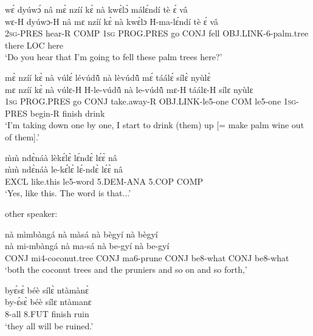\begin{exe} 
\exC\label{77}
  \glll  wɛ́ dyúwɔ́ nâ mɛ̀ nzíí kɛ̀ nà kwɛ̀lɔ̀ málɛ́ndí tè ɛ́ vâ \\
         wɛ-H dyúwɔ-H nâ mɛ nzíí kɛ̀ nà kwɛ̀lɔ H-ma-lɛ́ndí tè ɛ́ vâ \\
           2\textsc{sg}-PRES hear-R COMP 1\textsc{sg} PROG.PRES go CONJ fell OBJ.LINK-6-palm.tree there LOC here \\
    \trans `Do you hear that I'm going to fell these palm trees here?'
\end{exe}

\begin{exe} 
\exC\label{78}
  \glll   mɛ̀ nzíí kɛ̀ nà vúlɛ́ lévúdũ̂ nà lèvúdũ̂ mɛ́ táálɛ́ sílɛ̀ nyùlɛ̀ \\
          mɛ nzíí kɛ̀ nà vúlɛ-H H-le-vúdũ̂ nà le-vúdũ̂ mɛ-H táálɛ-H sílɛ nyùlɛ \\
           1\textsc{sg} PROG.PRES go CONJ take.away-R OBJ.LINK-le5-one COM le5-one 1\textsc{sg}-PRES begin-R finish drink \\
    \trans `I'm taking down one by one, I start to drink (them) up [= make palm wine out of them].'
\end{exe}

\begin{exe} 
\exC\label{79}
  \glll   m̀m̀ ndɛ̀náà lèkɛ́lɛ̀ lɛ́ndɛ̀ lɛ́ɛ̀ nâ \\
          m̀m̀ ndɛ̀náà le-kɛ́lɛ̀ lɛ́-ndɛ̀ lɛ́ɛ̀ nâ \\
         EXCL like.this  le5-word 5.DEM-ANA 5.COP COMP \\
    \trans `Yes, like this. The word is that...'
\end{exe}

\noindent other speaker:

\begin{exe} 
\exC\label{80}
  \glll  nà mìmbàngá nà màsá nà bègyí nà bègyí\\
       nà mi-mbàngá nà ma-sá nà be-gyí nà be-gyí\\
           CONJ mi4-coconut.tree CONJ ma6-prune CONJ be8-what CONJ be8-what\\
    \trans `both the coconut trees and the pruniers and so on and so forth,'
\end{exe}

\begin{exe} 
\exC\label{81} 
  \glll   byɛ́sɛ̀ béè sílɛ̀ ntàmànɛ̀  \\
      by-ɛ́sɛ̀ béè sílɛ ntàmanɛ \\
           8-all 8.FUT finish ruin \\
    \trans `they all will be ruined.'
\end{exe}

